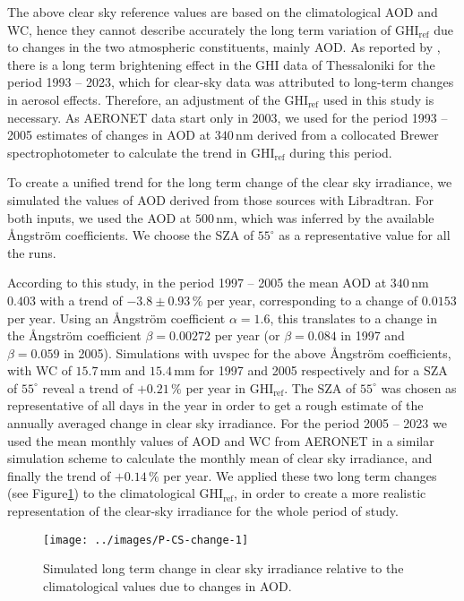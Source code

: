 \documentclass[preprint, 5p,
authoryear]{elsarticle} %
\begin{document}
The above clear sky reference values are based on the climatological AOD
and WC, hence they cannot describe accurately the long term variation of
\(\text{GHI}_\text{ref}\) due to changes in the two atmospheric
constituents, mainly AOD. As reported by \citet{Natsis2023}, there is a
long term brightening effect in the GHI data of Thessaloniki for the
period 1993 -- 2023, which for clear-sky data was attributed to
long-term changes in aerosol effects. Therefore, an adjustment of the
\(\text{GHI}_\text{ref}\) used in this study is necessary. As AERONET
data start only in 2003, we used for the period 1993 -- 2005 estimates
of changes in AOD at \(340\,\text{nm}\) derived from a collocated Brewer
spectrophotometer \citep{Kazadzis2007} to calculate the trend in
\(\text{GHI}_\text{ref}\) during this period.

To create a unified trend for the long term change of the clear sky
irradiance, we simulated the values of AOD derived from those sources
with Libradtran. For both inputs, we used the AOD at \(500\,\text{nm}\),
which was inferred by the available Ångström coefficients. We choose the
SZA of \(55^\circ\) as a representative value for all the runs.

According to this study, in the period 1997 -- 2005 the mean AOD at
\(340\,\text{nm}\) \(0.403\) with a trend of \(-3.8\pm0.93\,\%\) per
year, corresponding to a change of \(0.0153\) per year. Using an
Ångström coefficient \(\alpha = 1.6\), this translates to a change in
the Ångström coefficient \(\beta=0.00272\) per year (or \(\beta=0.084\)
in 1997 and \(\beta=0.059\) in 2005). Simulations with uvspec for the
above Ångström coefficients, with WC of \(15.7\,\text{mm}\) and
\(15.4\,\text{mm}\) for 1997 and 2005 respectively and for a SZA of
\(55^\circ\) reveal a trend of \(+0.21\,\%\) per year in
\(\text{GHI}_\text{ref}\). The SZA of \(55^\circ\) was chosen as
representative of all days in the year in order to get a rough estimate
of the annually averaged change in clear sky irradiance. For the period
2005 -- 2023 we used the mean monthly values of AOD and WC from AERONET
in a similar simulation scheme to calculate the monthly mean of clear
sky irradiance, and finally the trend of \(+0.14\,\%\) per year. We
applied these two long term changes (see
Figure\nobreakspace{}\ref{fig:CS-change}) to the climatological
\(\text{GHI}_\text{ref}\), in order to create a more realistic
representation of the clear-sky irradiance for the whole period of
study.

\begin{figure}

{\centering \texttt{[image: ../images/P-CS-change-1]} 

}

\caption{Simulated long term change in clear sky irradiance relative to the climatological values due to changes in AOD.}\label{fig:CS-change}
\end{figure}
\end{document}
